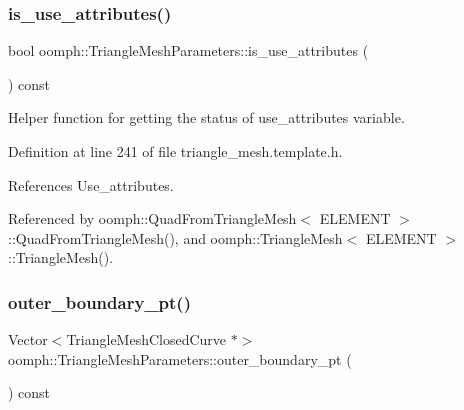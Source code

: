 \mbox{\label{classoomph_1_1TriangleMeshParameters_a47e45fd5669ff6260dd3198f6b3fa75c}} 
\subsubsection{\texorpdfstring{is\+\_\+use\+\_\+attributes()}{is\_use\_attributes()}}
{\footnotesize\ttfamily bool oomph\+::\+Triangle\+Mesh\+Parameters\+::is\+\_\+use\+\_\+attributes (\begin{DoxyParamCaption}{ }\end{DoxyParamCaption}) const\hspace{0.3cm}{\ttfamily [inline]}}



Helper function for getting the status of use\+\_\+attributes variable. 



Definition at line 241 of file triangle\+\_\+mesh.\+template.\+h.



References Use\+\_\+attributes.



Referenced by oomph\+::\+Quad\+From\+Triangle\+Mesh$<$ E\+L\+E\+M\+E\+N\+T $>$\+::\+Quad\+From\+Triangle\+Mesh(), and oomph\+::\+Triangle\+Mesh$<$ E\+L\+E\+M\+E\+N\+T $>$\+::\+Triangle\+Mesh().

\mbox{\label{classoomph_1_1TriangleMeshParameters_adf9ce760b49599e041fffb041fb4eb0e}} 
\subsubsection{\texorpdfstring{outer\+\_\+boundary\+\_\+pt()}{outer\_boundary\_pt()}\hspace{0.1cm}{\footnotesize\ttfamily [1/4]}}
{\footnotesize\ttfamily Vector$<$Triangle\+Mesh\+Closed\+Curve $\ast$$>$ oomph\+::\+Triangle\+Mesh\+Parameters\+::outer\+\_\+boundary\+\_\+pt (\begin{DoxyParamCaption}{ }\end{DoxyParamCaption}) const\hspace{0.3cm}{\ttfamily [inline]}}




